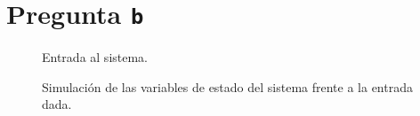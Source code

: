 \section{Pregunta \texttt{b}}

\begin{figure}[h]
  \centering
  
  \caption{Entrada al sistema.}\label{fig:entrada-sim}
\end{figure}

\begin{figure}[h]
  \centering
  
  \caption{Simulación de las variables de estado del sistema frente a la entrada dada.}\label{fig:estado-sim}
\end{figure}


